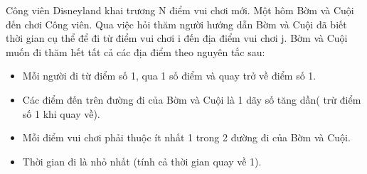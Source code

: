 Công viên Disneyland khai trương N điểm vui chơi mới. Một hôm Bờm và Cuội đến chơi Công viên. Qua việc hỏi thăm người hướng dẫn Bờm và Cuội đã biết thời gian cụ thể để đi từ điểm vui chơi i đến địa điểm vui chơi j. Bờm và Cuội muốn đi thăm hết tất cả các địa điểm theo nguyên tắc sau:
\begin{itemize}
	\item Mỗi người đi từ điểm số 1, qua 1 số điểm và quay trở về điểm số 1.
	\item Các điểm đến trên đường đi của Bờm và Cuội là 1 dãy số tăng dần( trừ điểm số 1 khi quay về).
	\item Mỗi điểm vui chơi phải thuộc ít nhất 1 trong 2 đường đi của Bờm và Cuội.
	\item Thời gian đi là nhỏ nhất (tính cả thời gian quay về 1).
\end{itemize}
